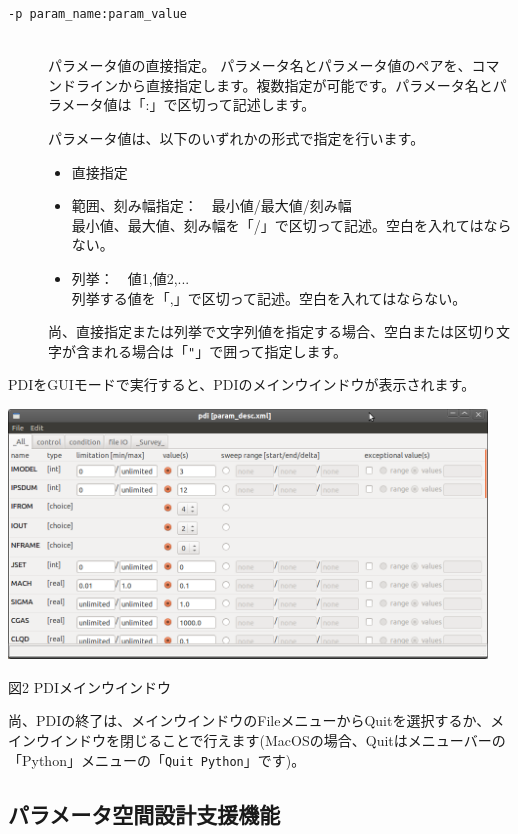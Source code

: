 \documentclass[a4paper,11pt]{jarticle}
\begin{document}
\begin{description}
\begin{description}
\item[{\tt -p param\_name:param\_value}] {\ }\\
パラメータ値の直接指定。
パラメータ名とパラメータ値のペアを、コマンドラインから直接指定します。複数指定が可能です。パラメータ名とパラメータ値は「:」で区切って記述します。

パラメータ値は、以下のいずれかの形式で指定を行います。
\begin{itemize}
\item 直接指定
\item 範囲、刻み幅指定：　最小値/最大値/刻み幅\\
最小値、最大値、刻み幅を「/」で区切って記述。空白を入れてはならない。
\item 列挙：　値1,値2,...\\
列挙する値を「,」で区切って記述。空白を入れてはならない。
\end{itemize}

尚、直接指定または列挙で文字列値を指定する場合、空白または区切り文字が含まれる場合は「{\tt "}」で囲って指定します。

\end{description}
\end{description}

PDIをGUIモードで実行すると、PDIのメインウインドウが表示されます。

\begin{center}
\includegraphics[width=360pt, bb=0 0 982 512]{figs/fig001.png}

図2 PDIメインウインドウ
\end{center}


尚、PDIの終了は、メインウインドウのFileメニューからQuitを選択するか、メインウインドウを閉じることで行えます(MacOSの場合、Quitはメニューバーの「Python」メニューの「{\tt Quit Python}」です)。


\subsection{パラメータ空間設計支援機能}
\end{document}
